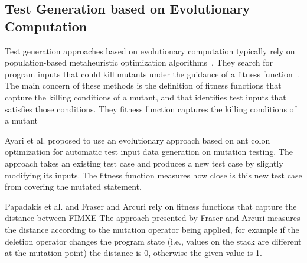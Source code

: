 \subsection{Test Generation based on Evolutionary Computation}

Test generation approaches based on evolutionary computation typically rely on  population-based metaheuristic optimization algorithms~\cite{}. 
They search for program inputs that could kill mutants under the guidance of a fitness function~\cite{harman2011strong}. 
The main concern of these methods is the definition of fitness functions that capture the killing conditions of a mutant, and that identifies test inputs that satisfies those conditions.
They fitness function captures the killing conditions of a mutant

Ayari et al. \cite{ayari2007automatic} proposed to use an evolutionary approach based on ant colon optimization for automatic test input data generation on mutation testing. 
The approach takes an existing test case and produces a new test case by slightly modifying its inputs. 
The fitness function measures how close is this new test case from covering the mutated statement.

Papadakis et al. \cite{papadakis2011automatically} and Fraser and Arcuri \cite{fraser2015achieving} rely on fitness functions that capture the distance between FIMXE
The approach presented by Fraser and Arcuri \cite{fraser2015achieving} measures the distance according to the mutation operator being applied, 
for example if the deletion operator changes the program state (i.e., values on the stack are different at the mutation point) the distance is 0, otherwise the given value is 1.

